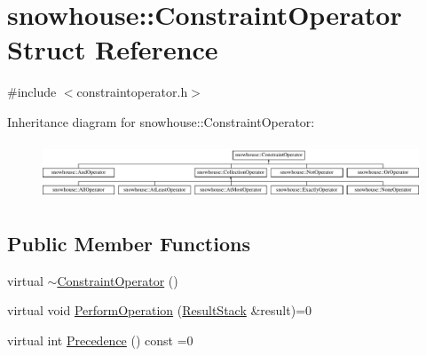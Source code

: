 \hypertarget{structsnowhouse_1_1ConstraintOperator}{}\section{snowhouse\+::Constraint\+Operator Struct Reference}
\label{structsnowhouse_1_1ConstraintOperator}


{\ttfamily \#include $<$constraintoperator.\+h$>$}

Inheritance diagram for snowhouse\+::Constraint\+Operator\+:\begin{figure}[H]
\begin{center}
\leavevmode
\includegraphics[height=1.705584cm]{structsnowhouse_1_1ConstraintOperator}
\end{center}
\end{figure}
\subsection*{Public Member Functions}
\begin{DoxyCompactItemize}
\item 
virtual \mbox{\hyperlink{structsnowhouse_1_1ConstraintOperator_ab34ad26e971feefdc35cd56d8f289633}{$\sim$\+Constraint\+Operator}} ()
\item 
virtual void \mbox{\hyperlink{structsnowhouse_1_1ConstraintOperator_a885882868139127eb8ff3f3ec6a97737}{Perform\+Operation}} (\mbox{\hyperlink{namespacesnowhouse_a719169b1315a13161c15f25e600a8f51}{Result\+Stack}} \&result)=0
\item 
virtual int \mbox{\hyperlink{structsnowhouse_1_1ConstraintOperator_ac7c231c1a9f183c0a2cce8544566eeff}{Precedence}} () const =0
\end{DoxyCompactItemize}
